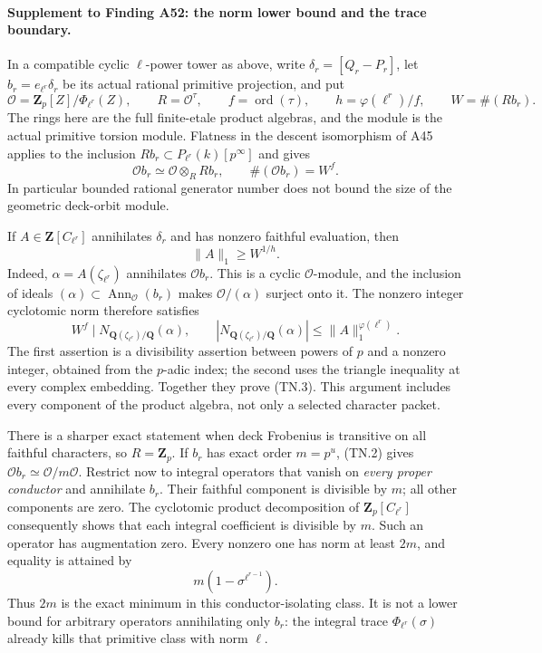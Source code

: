 \paragraph{Supplement to Finding A52: the norm lower bound and the trace boundary.}
In a compatible cyclic $\ell$-power tower as above, write
$\delta_r=[Q_r-P_r]$, let $b_r=e_{\ell^r}\delta_r$ be its actual
rational primitive projection, and put
\[
 \mathcal O=\mathbf Z_p[Z]/\Phi_{\ell^r}(Z),\qquad
 R=\mathcal O^\tau,\qquad f=\operatorname{ord}(\tau),\qquad
 h=\varphi(\ell^r)/f,\qquad W=\#(Rb_r).
\tag{TN.1}
\]
The rings here are the full finite-etale product algebras, and the
module is the actual primitive torsion module. Flatness in the
descent isomorphism of A45 applies to the inclusion
$Rb_r\subset P_{\ell^r}(k)[p^\infty]$ and gives
\[
                       \mathcal O b_r\simeq
                       \mathcal O\otimes_R Rb_r,
                   \qquad \#(\mathcal O b_r)=W^f.
\tag{TN.2}
\]
In particular bounded rational generator number does not bound the
size of the geometric deck-orbit module.

If $A\in\mathbf Z[C_{\ell^r}]$ annihilates $\delta_r$ and has nonzero
faithful evaluation, then
\[
                              \|A\|_1\ge W^{1/h}.
\tag{TN.3}
\]
Indeed, $\alpha=A(\zeta_{\ell^r})$ annihilates $\mathcal O b_r$.
This is a cyclic $\mathcal O$-module, and the inclusion of ideals
$(\alpha)\subset\operatorname{Ann}_{\mathcal O}(b_r)$ makes
$\mathcal O/(\alpha)$ surject onto it. The nonzero integer
cyclotomic norm therefore satisfies
\[
 W^f\mid N_{\mathbf Q(\zeta_{\ell^r})/\mathbf Q}(\alpha),
 \qquad
 \left|N_{\mathbf Q(\zeta_{\ell^r})/\mathbf Q}(\alpha)\right|
                   \le\|A\|_1^{\varphi(\ell^r)}.
\tag{TN.4}
\]
The first assertion is a divisibility assertion between powers of
$p$ and a nonzero integer, obtained from the $p$-adic index; the
second uses the triangle inequality at every complex embedding.
Together they prove (TN.3). This argument includes every component
of the product algebra, not only a selected character packet.

There is a sharper exact statement when deck Frobenius is transitive
on all faithful characters, so $R=\mathbf Z_p$. If $b_r$ has exact
order $m=p^u$, (TN.2) gives
$\mathcal O b_r\simeq\mathcal O/m\mathcal O$.
Restrict now to integral operators that vanish on \emph{every proper
conductor} and annihilate $b_r$. Their faithful component is divisible
by $m$; all other components are zero. The cyclotomic product
decomposition of $\mathbf Z_p[C_{\ell^r}]$ consequently shows that
each integral coefficient is divisible by $m$. Such an operator
has augmentation zero. Every nonzero one has norm at least $2m$,
and equality is attained by
\[
                         m(1-\sigma^{\ell^{r-1}}).
\tag{TN.5}
\]
Thus $2m$ is the exact minimum in this conductor-isolating class.
It is not a lower bound for arbitrary operators annihilating only
$b_r$: the integral trace $\Phi_{\ell^r}(\sigma)$ already kills
that primitive class with norm $\ell$.

